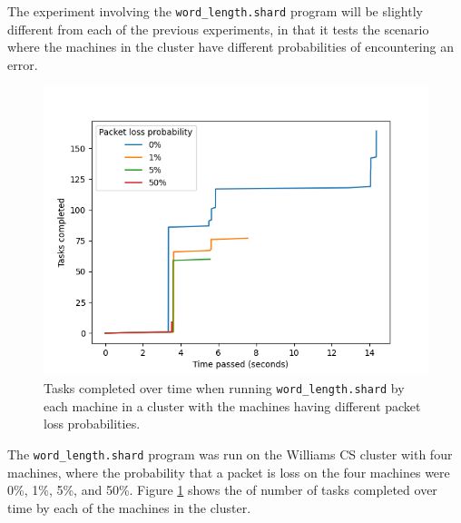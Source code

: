 \documentclass[twoside]{report}
\begin{document}
The experiment involving the \texttt{word\_length.shard} program will be slightly different from each of the previous experiments, in that it tests the scenario where the machines in the cluster have different probabilities of encountering an error.


\begin{figure}[h]
  \begin{center}
    \includegraphics[scale=0.9]{img/experiments/e10_1620960581241.png}
    \caption{Tasks completed over time when running \texttt{word\_length.shard} by each machine in a cluster with the machines having different packet loss probabilities.}
    \label{fig:packetlosswordlength}
  \end{center}
\end{figure}

The \texttt{word\_length.shard} program was run on the Williams CS cluster with four machines, where the probability that a packet is loss on the four machines were 0\%, 1\%, 5\%, and 50\%.
Figure \ref{fig:packetlosswordlength} shows the of number of tasks completed over time by each of the machines in the cluster.
\end{document}
